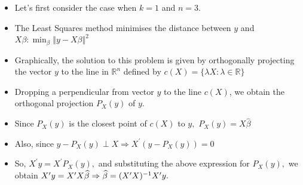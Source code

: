 \documentclass[notes=show]{beamer}
\begin{document}
\begin{frame}%


\begin{itemize}
\item Let's first consider the case when $k=1$ and $n=3.$

\item The Least Squares method minimises the distance between $y$ and $%
X\beta :\min_{\beta }\left\Vert y-X\beta \right\Vert ^{2}$

\item Graphically, the solution to this problem is given by orthogonally
projecting the vector $y$ to the line in $\mathbb{R}^{n}$ defined by $%
c(X)=\{\lambda X:\lambda \in \mathbb{R}\}$

\item Dropping a perpendicular from vector $y$ to the line $c(X)$, we obtain
the orthogonal projection $P_{X}(y)$ of $y.$

\item Since $P_{X}(y)$ is the closest point of $c(X)$ to $y,$ $P_{X}(y)=X%
\widehat{\beta }$

\item Also, since $y-P_{X}(y)\perp X\Rightarrow X^{\prime }(y-P_{X}(y))=0$

\item So, $X^{\prime }y=X^{\prime }P_{X}(y),$ and substituting the above
expression for $P_{X}(y),$ we obtain $X^{\prime }y=X^{\prime }X\widehat{%
\beta }\Rightarrow \widehat{\beta }=(X^{\prime }X)^{-1}X^{\prime }y.$
\end{itemize}

\end{frame}%
\end{document}
